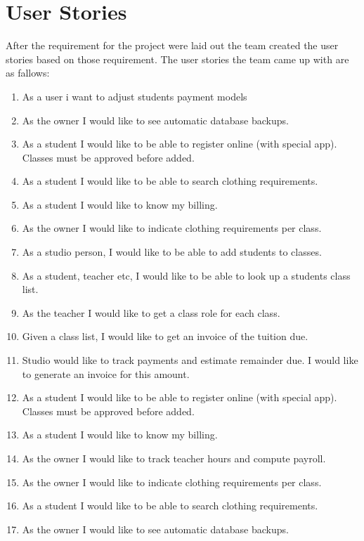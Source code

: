 \section{User Stories}
After the requirement for the project were laid out the team created the user stories based on those requirement. The user stories the team came up with are as fallows:

\begin{enumerate}
  \item As a user i want to adjust students payment models
  \item As the owner I would like to see automatic database backups.
  \item As a student I would like to be able to register online (with special app). Classes must be approved before added.
  \item As a student I would like to be able to search clothing requirements.
  \item As a student I would like to know my billing.
  \item As the owner I would like to indicate clothing requirements per class.
  \item As a studio person, I would like to be able to add students to classes.
  \item  As a student, teacher etc, I would like to be able to look up a students class list.
  \item As the teacher I would like to get a class role for each class.
  \item Given a class list, I would like to get an invoice of the tuition due.
  \item Studio would like to track payments and estimate remainder due.  I would like to generate an invoice for this amount.
  \item As a student I would like to be able to register online (with special app).   Classes must be approved before added.
  \item As a student I would like to know my billing.
  \item As the owner I would like to track teacher hours and compute payroll.
  \item As the owner I would like to indicate clothing requirements per class.
  \item As a student I would like to be able to search clothing requirements.
  \item As the owner I would like to see automatic database backups.
\end{enumerate}



